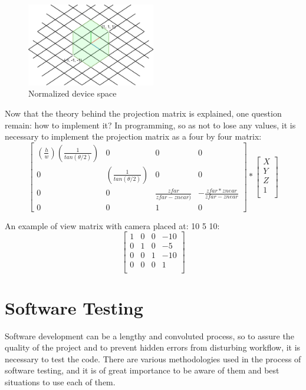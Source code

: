 \begin{figure}[H]
  \begin{center}
  \includegraphics[width=0.5\textwidth]{figures/space.png}  
  \end{center}
  \caption{Normalized device space}
\end{figure}

Now that the theory behind the projection matrix is explained, one question remain: how to implement it? In programming, so as not to lose any values, it is necessary to implement the projection matrix as a four by four matrix: 
\begin{equation}
\begin{bmatrix}
(\frac{h}{w})(\frac{1}{tan(\theta/2)}) & 0 & 0 & 0\\
0 & (\frac{1}{tan(\theta/2)}) & 0 & 0\\
0 & 0 & \frac{zfar}{zfar - znear)} & -\frac{zfar * znear}{zfar-znear}\\
0 & 0 & 1 & 0
\end{bmatrix} 
*
\begin{bmatrix}
X\\
Y\\
Z\\
1\\
\end{bmatrix} 
\label{projectionmatrixequation}
\end{equation} 


An example of view matrix with camera placed at: 10 5 10:
\[
\begin{bmatrix}
1 & 0 & 0 & -10\\
0 & 1 & 0 & -5\\
0 & 0 & 1 & -10\\
0 & 0 & 0 & 1\\
\end{bmatrix} 
\]

\newpage
\section{Software Testing}
\label{sec:testing}
\hspace{\parindent}
Software development can be a lengthy and convoluted process, so to assure the quality of the project and to prevent hidden errors from disturbing workflow, it is necessary to test the code. There are various methodologies used in the process of software testing, and it is of great importance to be aware of them and best situations to use each of them.
